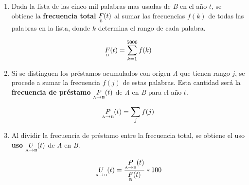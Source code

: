 \begin{enumerate}
	\label{proceso_uso}
	
	\item  Dada la lista de las cinco mil palabras mas usadas de \textit{B} en el año $t$, se obtiene la \textbf{frecuencia total} $\underset{\text{\tiny B}}{F}(t)$ al sumar las frecuencias $f(k)$ de todas las palabras en la lista, donde $k$ determina el rango  de cada palabra.
	
	\begin{equation}
	\label{ec.ftot}
	\underset{\text{\tiny B}}{F}(t) = \sum_{k=1}^{5000} f(k)
	\end{equation}
	
	
	
	\item Si se distinguen los préstamos acumulados con origen \textit{A}  que tienen rango $j$,  se procede a sumar la frecuencia $f(j)$ de estas palabras.  Esta cantidad será la  \textbf{frecuencia de préstamo} $\underset{ \text{\tiny A} \to  \text{\tiny B} }{P}(t)$   de \textit{A} en \textit{B} para el año $t$.
	
	\begin{equation}
	\label{ec.fpres}
	\underset{ \text{\tiny A} \to  \text{\tiny B} }{P}(t) = \sum_{j} f(j)
	\end{equation}
	
	
	\item  Al dividir la frecuencia de préstamo entre la frecuencia total, se obtiene el uso \textbf{uso} $\underset{ \text{\tiny A} \to  \text{\tiny B} }{U}(t)$  de \textit{A} en \textit{B}.  
	
	\begin{equation}
	\label{ec.fuso}
	\underset{ \text{\tiny A} \to  \text{\tiny B} }{U}(t) = \frac{	\underset{ \text{\tiny A} \to  \text{\tiny B} }{P}(t)}{\underset{\text{\tiny B}}{F}(t) } * 100
	\end{equation}
	
	

\end{enumerate}
